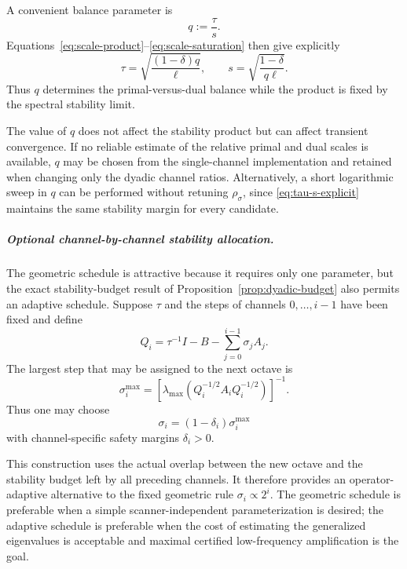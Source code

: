 \documentclass{article}
\begin{document}
A convenient balance parameter is
\[
q:=\frac{\tau}{s}.
\]
Equations~\eqref{eq:scale-product}--\eqref{eq:scale-saturation}
then give explicitly
\begin{equation}
\label{eq:tau-s-explicit}
\tau
=
\sqrt{
\frac{(1-\delta)q}{\ell}
},
\qquad
s
=
\sqrt{
\frac{1-\delta}{q\ell}
}.
\end{equation}
Thus $q$ determines the primal-versus-dual balance while the product
is fixed by the spectral stability limit.

The value of $q$ does not affect the stability product but can affect
transient convergence.  If no reliable estimate of the relative
primal and dual scales is available, $q$ may be chosen from the
single-channel implementation and retained when changing only the
dyadic channel ratios.  Alternatively, a short logarithmic sweep in
$q$ can be performed without retuning $\rho_\sigma$, since
\eqref{eq:tau-s-explicit} maintains the same stability margin for
every candidate.

\subparagraph{Optional channel-by-channel stability allocation.}
The geometric schedule is attractive because it requires only one
parameter, but the exact stability-budget result of
Proposition~\ref{prop:dyadic-budget} also permits an adaptive
schedule.  Suppose $\tau$ and the steps of channels
$0,\ldots,i-1$ have been fixed and define
\[
Q_i
=
\tau^{-1}I
-
B
-
\sum_{j=0}^{i-1}\sigma_jA_j.
\]
The largest step that may be assigned to the next octave is
\[
\sigma_i^{\max}
=
\left[
\lambda_{\max}
\left(
Q_i^{-1/2}A_iQ_i^{-1/2}
\right)
\right]^{-1}.
\]
Thus one may choose
\begin{equation}
\label{eq:adaptive-octave-step}
\sigma_i
=
(1-\delta_i)\sigma_i^{\max}
\end{equation}
with channel-specific safety margins $\delta_i>0$.

This construction uses the actual overlap between the new octave and
the stability budget left by all preceding channels.  It therefore
provides an operator-adaptive alternative to the fixed geometric rule
$\sigma_i\propto2^i$.  The geometric schedule is preferable when a
simple scanner-independent parameterization is desired; the adaptive
schedule is preferable when the cost of estimating the generalized
eigenvalues is acceptable and maximal certified low-frequency
amplification is the goal.
\end{document}

